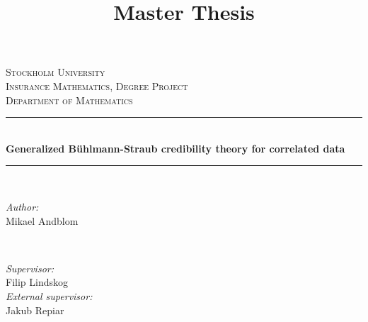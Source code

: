 \documentclass[11pt]{article}
\title{Master Thesis}
\theoremstyle{definition}
\begin{document}
\begin{titlepage}

\newcommand{\HRule}{\rule{\linewidth}{0.5mm}} %

\center %
 

\textsc{\LARGE Stockholm University}\\[1.5cm] %
\textsc{\Large Insurance Mathematics, Degree Project}\\[0.5cm] %
\textsc{\large Department of Mathematics}\\[0.5cm] %


\HRule \\[0.4cm]
{ \huge \bfseries Generalized Bühlmann-Straub credibility theory for correlated data}\\[0.4cm] %
\HRule \\[1.5cm]
 

\begin{minipage}{0.4\textwidth}
\begin{flushleft} \large
\emph{Author:}\\
Mikael Andblom %
\end{flushleft}
\end{minipage}
~
\begin{minipage}{0.4\textwidth}
\begin{flushright} \large
\emph{Supervisor:}\\
Filip Lindskog\\
\vspace{.5cm}
\emph{External supervisor:} \\
Jakub Repiar 
\end{flushright}
\end{minipage}\\[2cm]


\end{titlepage}
\end{document}
